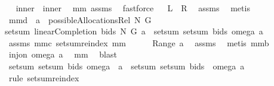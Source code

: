 \begin{isabellebody}
\ \isamarkupfalse%
\ {\isachardoublequoteopen}{\isacharquery}inner{}\ {\isacharequal}\ {\isacharquery}inner{}{\isachardoublequoteclose}\ \isamarkupfalse%
\ mm{}{}\ assms\ \isamarkupfalse%
\ fastforce\isanewline
{}\isamarkupfalse%
\ \isamarkupfalse%
\ {\isachardoublequoteopen}{\isacharquery}L\ {\isacharequal}\ {\isacharquery}R{\isachardoublequoteclose}\ \isamarkupfalse%
\ assms\ \isamarkupfalse%
\ metis\isanewline
{}\isamarkupfalse%
%
\endisatagproof
{\isafoldproof}%
%
\isadelimproof
\isanewline
%
\endisadelimproof
\isanewline
{}\isamarkupfalse%
\ mm{}{}d{\isacharcolon}\ \ {\isachardoublequoteopen}a\ {\isasymin}\ possibleAllocationsRel\ N\ G{\isachardoublequoteclose}\ \isanewline
{\isachardoublequoteopen}setsum\ {\isacharparenleft}linearCompletion{\isacharprime}\ bids\ N\ G{\isacharparenright}\ a\ {\isacharequal}\ setsum\ {\isacharparenleft}setsum\ bids{\isacharparenright}\ {\isacharparenleft}omega{\isacharbackquote}\ a{\isacharparenright}{\isachardoublequoteclose}\isanewline
%
\isadelimproof
%
\endisadelimproof
%
\isatagproof
{}\isamarkupfalse%
\ assms\ mm{}{}c\ setsum{\isachardot}reindex\ mm{}{}\ \isanewline
{}\isamarkupfalse%
\ {\isacharminus}\isanewline
{}\isamarkupfalse%
\ {\isachardoublequoteopen}{\isacharbraceleft}{\isacharbraceright}\ {\isasymnotin}\ Range\ a{\isachardoublequoteclose}\ \isamarkupfalse%
\ assms\ \isamarkupfalse%
\ {\isacharparenleft}metis\ mm{}{}b{\isacharparenright}\isanewline
{}\isamarkupfalse%
\ \isamarkupfalse%
\ {\isachardoublequoteopen}inj{\isacharunderscore}on\ omega\ a{\isachardoublequoteclose}\ \isamarkupfalse%
\ mm{}{}\ \isamarkupfalse%
\ blast\isanewline
{}\isamarkupfalse%
\ \isamarkupfalse%
\ {\isachardoublequoteopen}setsum\ {\isacharparenleft}setsum\ bids{\isacharparenright}\ {\isacharparenleft}omega\ {\isacharbackquote}\ a{\isacharparenright}\ {\isacharequal}\ setsum\ {\isacharparenleft}{\isacharparenleft}setsum\ bids{\isacharparenright}\ {\isasymcirc}\ omega{\isacharparenright}\ a{\isachardoublequoteclose}\ \isanewline
{}\isamarkupfalse%
\ {\isacharparenleft}rule\ setsum{\isachardot}reindex{\isacharparenright}\isanewline

\end{isabellebody}
